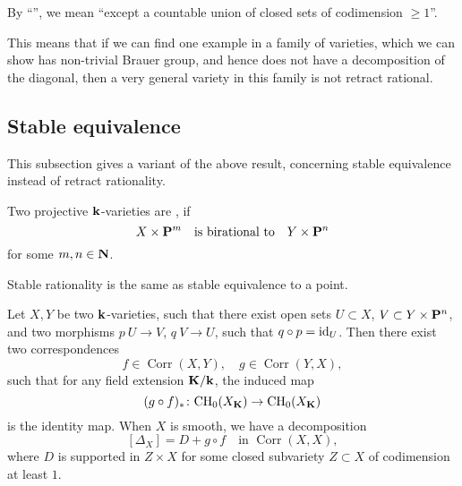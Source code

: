 By ``'', we mean ``except a countable union of closed sets of codimension $\geq 1$''.

This means that if we can find one example in a family of varieties,
which we can show has non-trivial Brauer group,
and hence does not have a decomposition of the diagonal,
then a very general variety in this family is not retract rational.


\subsection{Stable equivalence}

This subsection gives a variant of the above result,
concerning stable equivalence instead of retract rationality.

\begin{definition}
    Two projective $\bbk$-varieties are , if
    \[ X \times \bbP^m \quad \text{is birational to} \quad Y \times \bbP^n \]
    for some $m, n \in \bbN$.
\end{definition}

Stable rationality is the same as stable equivalence to a point.

\begin{lemma} \label{lem-3-stable-eq-cycles}
    Let $X,Y$ be two $\bbk$-varieties, such that there exist open sets $U \subset X$,
    $V \subset Y \times \bbP^n$, and two morphisms $p \: U \to V$, $q \: V \to U$,
    such that $q \circ p = \mathrm{id}_U$.
    Then there exist two correspondences
    \[ f \in \operatorname{Corr} (X, Y), \quad g \in \operatorname{Corr} (Y, X), \]
    such that
    for any field extension $\bbK/\bbk$, the induced map
    \[ (g \circ f)_* \: \CH_0 (X_{\bbK}) \to \CH_0 (X_{\bbK}) \]
    is the identity map.
    When $X$ is smooth, we have a decomposition
    \[ [\Delta_X] = D + g \circ f \quad \text{in } \operatorname{Corr} (X, X), \]
    where $D$ is supported in $Z \times X$
    for some closed subvariety $Z \subset X$ of codimension at least $1$.
\end{lemma}

